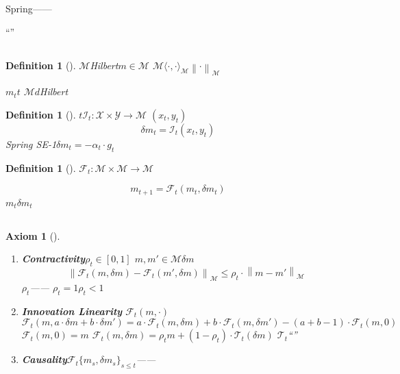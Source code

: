 \documentclass[11pt,a4paper]{article}
\newtheorem{definition}[theorem]{Definition}
\newtheorem{assumption}[theorem]{Axiom}
\theoremstyle{remark}
\newcommand{\Y}{\mathcal{Y}}
\newcommand{\X}{\mathcal{X}}
\newcommand{\Mmem}{\mathcal{M}}
\newcommand{\Fforget}{\mathcal{F}}
\newcommand{\norm}[1]{\left\lVert#1\right\rVert}
\newcommand{\inner}[1]{\langle#1\rangle}
\begin{document}
Spring——
\textbf{}

``''

\subsection{}

\begin{definition}[]\label{def:memory_space}
\textbf{}$\Mmem$Hilbert$m \in \Mmem$\textbf{}
$\Mmem$$\inner{\cdot, \cdot}_{\Mmem}$$\norm{\cdot}_{\Mmem}$

$m_t$$t$
$\Mmem$$d$Hilbert
\end{definition}

\begin{definition}[]\label{def:injection}
$t$\textbf{}$\mathcal{I}_t: \X \times \Y \to \Mmem$
$(x_t, y_t)$
\begin{equation}
    \delta m_t = \mathcal{I}_t(x_t, y_t)
\end{equation}
Spring SE-1$\delta m_t = -\alpha_t \cdot g_t$
\end{definition}

\begin{definition}[]\label{def:forgetting_operator}
\textbf{}$\Fforget_t: \Mmem \times \Mmem \to \Mmem$

\begin{equation}
    m_{t+1} = \Fforget_t(m_t, \delta m_t)
\end{equation}
$m_t$$\delta m_t$
\end{definition}

\subsection{}

\textbf{}


\begin{assumption}[]\label{ax:forgetting}
\begin{enumerate}[label=(A\arabic*), leftmargin=*]
    \item \textbf{Contractivity}$\rho_t \in [0, 1]$
          $m, m' \in \Mmem$$\delta m$
          \begin{equation}
              \norm{\Fforget_t(m, \delta m) - \Fforget_t(m', \delta m)}_{\Mmem}
              \leq \rho_t \cdot \norm{m - m'}_{\Mmem}
          \end{equation}
          $\rho_t$\textbf{}——
          $\rho_t = 1$$\rho_t < 1$
    \item \textbf{Innovation Linearity}
          $\Fforget_t(m, \cdot)$
          \begin{equation}
              \Fforget_t(m, a \cdot \delta m + b \cdot \delta m')
              = a \cdot \Fforget_t(m, \delta m) + b \cdot \Fforget_t(m, \delta m') - (a+b-1) \cdot \Fforget_t(m, 0)
          \end{equation}
          $\Fforget_t(m, 0) = m$
          $\Fforget_t(m, \delta m) = \rho_t m + (1-\rho_t) \cdot \mathcal{T}_t(\delta m)$
          $\mathcal{T}_t$``''
    \item \textbf{Causality}$\Fforget_t$$\{m_s, \delta m_s\}_{s \leq t}$——
          
\end{enumerate}
\end{assumption}
\end{document}
